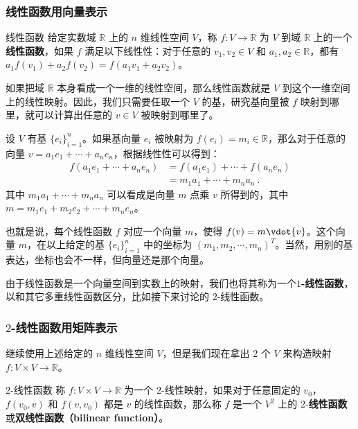 \subsubsection{线性函数用向量表示}
\begin{definition}{线性函数}
给定实数域 $\mathbb{R}$ 上的 $n$ 维线性空间 $V$，称 $f:V\rightarrow \mathbb{R}$ 为 $V$ 到域 $\mathbb{R}$ 上的一个\textbf{线性函数}，如果 $f$ 满足以下线性性：对于任意的 ${v}_1, {v}_2\in V$ 和 $a_1, a_2\in\mathbb{R}$，都有 $a_1f({v}_1)+a_2f({v}_2)=f(a_1{v}_1+a_2{v}_2)$。
\end{definition}

如果把域 $\mathbb{R}$ 本身看成一个一维的线性空间，那么线性函数就是 $V$ 到这个一维空间上的线性映射。因此，我们只需要任取一个 $V$ 的基，研究基向量被 $f$ 映射到哪里，就可以计算出任意的 ${v}\in V$ 被映射到哪里了。

设 $V$ 有基 $\{{e}_i\}_{i=1}^n$。如果基向量 ${e}_i$ 被映射为 $f({e}_i)=m_i\in\mathbb{R}$，那么对于任意的向量 ${v}=a_1{e}_1+\cdots+a_n{e}_n$，根据线性性可以得到：
\begin{equation}
\begin{aligned}
f(a_1{e}_1+\cdots+a_n{e}_n)&=f(a_1{e}_1)+\cdots+f(a_n{e}_n)\\
&=m_1a_1+\cdots+m_na_n~.
\end{aligned}
\end{equation}
其中 $m_1a_1+\cdots+m_na_n$ 可以看成是向量 ${m}$ 点乘 ${v}$ 所得到的，其中 ${m}=m_1{e}_1+m_2{e}_2+\cdots+m_n{e}_n$。

也就是说，每个线性函数 $f$ 对应一个向量 ${m}$，使得 $f({v})={m}\vdot{v}$。这个向量 ${m}$，在以上给定的基 $\{{e}_i\}_{i=1}^n$ 中的坐标为 $(m_1, m_2, \cdots, m_n)^T$。当然，用别的基表达，坐标也会不一样，但向量还是那个向量。

由于线性函数是一个向量空间到实数上的映射，我们也将其称为一个\textbf{$1$-线性函数}，以和其它多重线性函数区分，比如接下来讨论的 $2$-线性函数。

\subsubsection{$2$-线性函数用矩阵表示}

继续使用上述给定的 $n$ 维线性空间 $V$，但是我们现在拿出 $2$ 个 $V$ 来构造映射 $f:V\times V\rightarrow\mathbb{R}$。

\begin{definition}{$2$-线性函数}\label{def_Tensor_1}
称 $f:V\times V\rightarrow\mathbb{R}$ 为一个 $2$-线性映射，如果对于任意固定的 ${v}_0$，$f({v}_0, {v})$ 和 $f({v}, {v}_0)$ 都是 ${v}$ 的线性函数，那么称 $f$ 是一个 $V^2$ 上的 $2$-\textbf{线性函数}或\textbf{双线性函数（bilinear function）}。
\end{definition}

